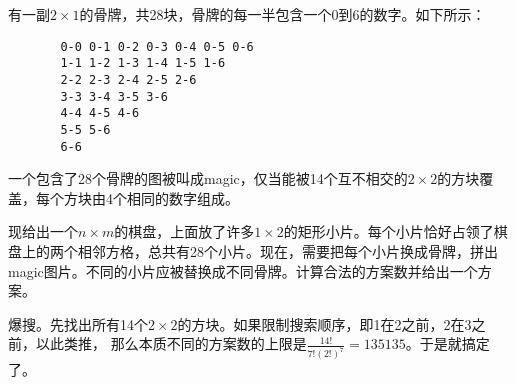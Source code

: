 \begin{prob}
	有一副$2\times 1$的骨牌，共28块，骨牌的每一半包含一个0到6的数字。如下所示： \begin{verbatim}
	　　0-0 0-1 0-2 0-3 0-4 0-5 0-6
	　　1-1 1-2 1-3 1-4 1-5 1-6
	　　2-2 2-3 2-4 2-5 2-6
	　　3-3 3-4 3-5 3-6
	　　4-4 4-5 4-6
	　　5-5 5-6
	　　6-6
	\end{verbatim}
	一个包含了28个骨牌的图被叫成magic，仅当能被14个互不相交的$2 \times 2$的方块覆盖，每个方块由4个相同的数字组成。\par
	现给出一个$n \times m$的棋盘，上面放了许多$1 \times 2$的矩形小片。每个小片恰好占领了棋盘上的两个相邻方格，总共有28个小片。现在，需要把每个小片换成骨牌，拼出magic图片。不同的小片应被替换成不同骨牌。计算合法的方案数并给出一个方案。
\end{prob}

\begin{sol}
	爆搜。先找出所有14个$2 \times 2$的方块。如果限制搜索顺序，即1在2之前，2在3之前，以此类推，
	那么本质不同的方案数的上限是$\frac{14!}{7!(2!)^7}=135135$。于是就搞定了。
\end{sol}
